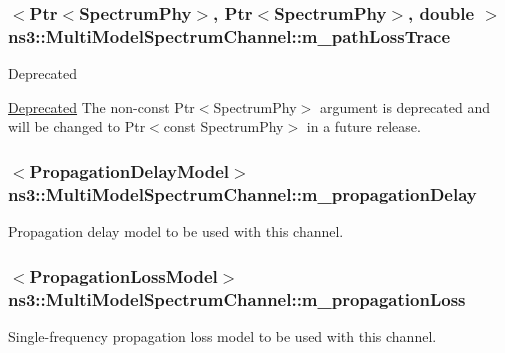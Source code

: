 \subsubsection[{\texorpdfstring{m\+\_\+path\+Loss\+Trace}{m_pathLossTrace}}]{$<${\bf Ptr}$<${\bf Spectrum\+Phy}$>$, {\bf Ptr}$<${\bf Spectrum\+Phy}$>$, double $>$ ns3\+::\+Multi\+Model\+Spectrum\+Channel\+::m\+\_\+path\+Loss\+Trace\hspace{0.3cm}{\ttfamily [private]}}\hypertarget{classns3_1_1MultiModelSpectrumChannel_ab3333c1804de2472073cf3725f6f7f59}{}\label{classns3_1_1MultiModelSpectrumChannel_ab3333c1804de2472073cf3725f6f7f59}
\begin{DoxyRefDesc}{Deprecated}
\item[\hyperlink{deprecated__deprecated000031}{Deprecated}]The non-\/const {\ttfamily Ptr$<$\+Spectrum\+Phy$>$} argument is deprecated and will be changed to {\ttfamily Ptr$<$const Spectrum\+Phy$>$} in a future release. \end{DoxyRefDesc}
\subsubsection[{\texorpdfstring{m\+\_\+propagation\+Delay}{m_propagationDelay}}]{$<${\bf Propagation\+Delay\+Model}$>$ ns3\+::\+Multi\+Model\+Spectrum\+Channel\+::m\+\_\+propagation\+Delay\hspace{0.3cm}{\ttfamily [private]}}\hypertarget{classns3_1_1MultiModelSpectrumChannel_a4a7d01850e693c72297d9d4a2faeb918}{}\label{classns3_1_1MultiModelSpectrumChannel_a4a7d01850e693c72297d9d4a2faeb918}
Propagation delay model to be used with this channel. 
\subsubsection[{\texorpdfstring{m\+\_\+propagation\+Loss}{m_propagationLoss}}]{$<${\bf Propagation\+Loss\+Model}$>$ ns3\+::\+Multi\+Model\+Spectrum\+Channel\+::m\+\_\+propagation\+Loss\hspace{0.3cm}{\ttfamily [private]}}\hypertarget{classns3_1_1MultiModelSpectrumChannel_a7b0ae25fd33c9fbccf4984526abb0827}{}\label{classns3_1_1MultiModelSpectrumChannel_a7b0ae25fd33c9fbccf4984526abb0827}
Single-\/frequency propagation loss model to be used with this channel. 
